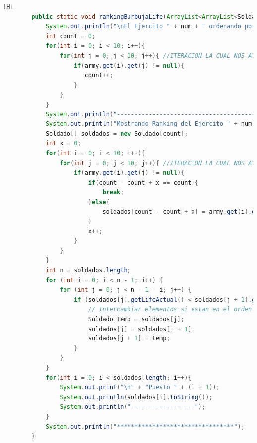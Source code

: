 \documentclass{article}
\begin{document}
	\begin{lstlisting}[language=java,caption={Las lineas de codigos del metodo creado:}][H]
		public static void rankingBurbujaLife(ArrayList<ArrayList<Soldado>> army , int num){
			System.out.println("\nEl Ejercito " + num + " ordenando por metodo burbuja: ");
			int count = 0;
			for(int i = 0; i < 10; i++){
				for(int j = 0; j < 10; j++){ //ITERACION LA CUAL NOS AYUDA A PASAR POR TODOS LOS SOLDADOS DE CADA EJERCITO
					if(army.get(i).get(j) != null){ 
					   count++;
					}
				}
			}
			System.out.println("------------------------------------------");
			System.out.println("Mostrando Ranking del Ejercito " + num + " ..... ////// --->");
			Soldado[] soldados = new Soldado[count];
			int x = 0;
			for(int i = 0; i < 10; i++){
				for(int j = 0; j < 10; j++){ //ITERACION LA CUAL NOS AYUDA A PASAR POR TODOS LOS SOLDADOS AL ARRAY SOLDADO PARA PODER USAR EL USO DEL METODO DE ORDENACION BURBUJA
					if(army.get(i).get(j) != null){ 
						if(count - count + x == count){
							break;
						}else{
							soldados[count - count + x] = army.get(i).get(j);
						}
						x++;   
					}
				}
			}
			int n = soldados.length;
			for (int i = 0; i < n - 1; i++) {
				for (int j = 0; j < n - 1 - i; j++) {
					if (soldados[j].getLifeActual() < soldados[j + 1].getLifeActual()) {
						// Intercambiar elementos si estan en el orden incorrecto
						Soldado temp = soldados[j];
						soldados[j] = soldados[j + 1];
						soldados[j + 1] = temp;
					}
				}
			}
			for(int i = 0; i < soldados.length; i++){
				System.out.print("\n" + "Puesto " + (i + 1));
				System.out.println(soldados[i].toString());
				System.out.println("------------------");
			}
			System.out.println("*********************************");
		}

	\end{lstlisting}
\end{document}
